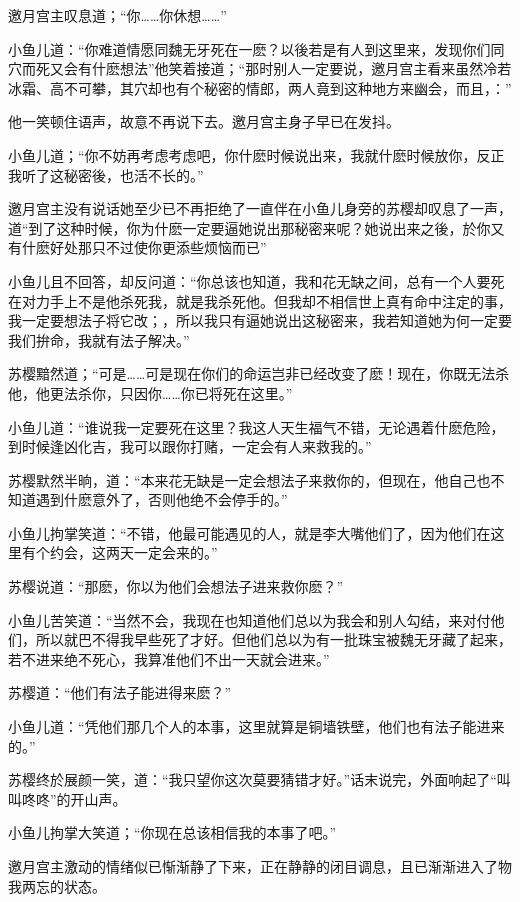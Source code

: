 \documentclass[12pt,oneside]{book}
\begin{document}
邀月宫主叹息道；``你\ldots\ldots 你休想\ldots\ldots{}''

小鱼儿道：``你难道情愿同魏无牙死在一麽？以後若是有人到这里来，发现你们同穴而死又会有什麽想法''他笑着接道；``那时别人一定要说，邀月宫主看来虽然冷若冰霜、高不可攀，其穴却也有个秘密的情郎，两人竟到这种地方来幽会，而且，：''

他一笑顿住语声，故意不再说下去。邀月宫主身子早已在发抖。

小鱼儿道；``你不妨再考虑考虑吧，你什麽时候说出来，我就什麽时候放你，反正我听了这秘密後，也活不长的。''

邀月宫主没有说话她至少已不再拒绝了一直伴在小鱼儿身旁的苏樱却叹息了一声，道``到了这种时候，你为什麽一定要逼她说出那秘密来呢？她说出来之後，於你又有什麽好处那只不过使你更添些烦恼而已''

小鱼儿且不回答，却反问道：``你总该也知道，我和花无缺之间，总有一个人要死在对力手上不是他杀死我，就是我杀死他。但我却不相信世上真有命中注定的事，我一定要想法子将它改；，所以我只有逼她说出这秘密来，我若知道她为何一定要我们拚命，我就有法子解决。''

苏樱黯然道；``可是\ldots\ldots 可是现在你们的命运岂非已经改变了麽！现在，你既无法杀他，他更法杀你，只因你\ldots\ldots 你已将死在这里。''

小鱼儿道：``谁说我一定要死在这里？我这人天生福气不错，无论遇着什麽危险，到时候逢凶化吉，我可以跟你打赌，一定会有人来救我的。''

苏樱默然半晌，道：``本来花无缺是一定会想法子来救你的，但现在，他自己也不知道遇到什麽意外了，否则他绝不会停手的。''

小鱼儿拘掌笑道：``不错，他最可能遇见的人，就是李大嘴他们了，因为他们在这里有个约会，这两天一定会来的。''

苏樱说道：``那麽，你以为他们会想法子进来救你麽？''

小鱼儿苦笑道：``当然不会，我现在也知道他们总以为我会和别人勾结，来对付他们，所以就巴不得我早些死了才好。但他们总以为有一批珠宝被魏无牙藏了起来，若不进来绝不死心，我算准他们不出一天就会进来。''

苏樱道：``他们有法子能进得来麽？''

小鱼儿道：``凭他们那几个人的本事，这里就算是铜墙铁壁，他们也有法子能进来的。''

苏樱终於展颜一笑，道：``我只望你这次莫要猜错才好。''话末说完，外面响起了``叫叫咚咚''的开山声。

小鱼儿拘掌大笑道；``你现在总该相信我的本事了吧。''

邀月宫主激动的情绪似已惭渐静了下来，正在静静的闭目调息，且已渐渐进入了物我两忘的状态。
\end{document}
